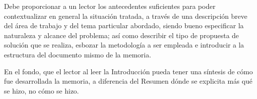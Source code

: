 
Debe proporcionar a un lector los antecedentes suficientes para poder contextualizar en general la situación tratada, a través de una descripción breve del área de trabajo y del tema particular abordado, siendo bueno especificar la naturaleza y alcance del problema; así como describir el tipo de propuesta de solución que se realiza, esbozar la metodología a ser empleada e introducir a la estructura del documento mismo de la memoria.

En el fondo, que el lector al leer la Introducción pueda tener una síntesis de cómo fue desarrollada la memoria, a diferencia del Resumen dónde se explicita más qué se hizo, no cómo se hizo.
